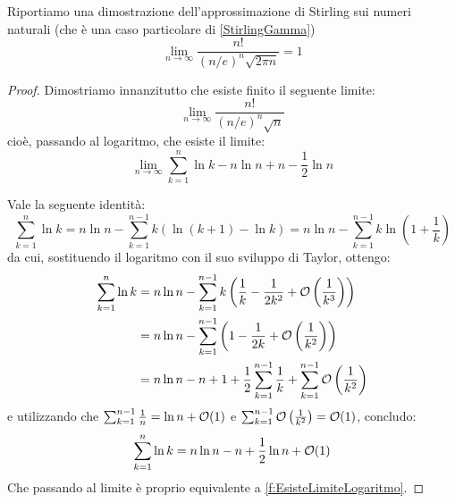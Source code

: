 \begin{theorem}\label{f:StirlingNaturali}
	Riportiamo una dimostrazione dell'approssimazione di Stirling sui numeri naturali (che è una caso
	particolare di \cref{StirlingGamma})
	\begin{equation*}
		\lim_{n\to\infty}{\frac{n!}{(n/e)^n\sqrt{2\pi n}}}=1
	\end{equation*}
\end{theorem}
\begin{proof}
	Dimostriamo innanzitutto che esiste finito il seguente limite:
	\begin{equation}\label{f:EsisteLimite}
		\lim_{n\to\infty}{\frac{n!}{(n/e)^n\sqrt{n}}}
	\end{equation}
	cioè, passando al logaritmo, che esiste il limite:
	\begin{equation}\label{f:EsisteLimiteLogaritmo}
		\lim_{n\to\infty}{\sum_{k=1}^{n}\ln k-n\ln n+n-\frac{1}{2}\ln n}
	\end{equation}
	
	Vale la seguente identità:
	\begin{equation*}
		\sum_{k=1}^{n}\ln k=n\ln n-\sum_{k=1}^{n-1}{k\left(\ln(k+1)-\ln k \right)}=n\ln n-\sum_{k=1}^{n-1}{k\ln\left(1+\frac{1}{k}\right)}
	\end{equation*}
	da cui, sostituendo il logaritmo con il suo sviluppo di Taylor, ottengo:
	\begin{equation*}
	\begin{split}
		\sum_{k=1}^{n}\ln k	& =n\ln n-\sum_{k=1}^{n-1}{k\left(\frac{1}{k}-\frac{1}{2k^2}+\mathcal{O}\left(\frac{1}{k^3}\right) \right)}\\
							& =n\ln n-\sum_{k=1}^{n-1}\left(1-\frac{1}{2k}+\mathcal{O}\left(\frac{1}{k^2}\right)  \right)\\
							& =n\ln n-n+1+\frac{1}{2}\sum_{k=1}^{n-1}\frac{1}{k}+\sum_{k=1}^{n-1}\mathcal{O}\left(\frac{1}{k^2}\right)
	\end{split}
	\end{equation*}
	e utilizzando che $\sum_{k=1}^{n-1}\frac{1}{n}=\ln n+\mathcal{O}(1)$ e 
	$\sum_{k=1}^{n-1}\mathcal{O}\left(\frac{1}{k^2}\right)=\mathcal{O}(1)$, concludo:
	\begin{equation}\label{f:QuasiStirlingNaturali}
		\sum_{k=1}^{n}\ln k=n\ln n-n+\frac{1}{2}\ln n + \mathcal{O}(1)
	\end{equation}
	Che passando al limite è proprio equivalente a \cref{f:EsisteLimiteLogaritmo}.
	

\end{proof}
